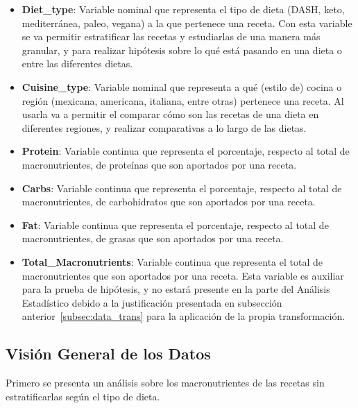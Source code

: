 \documentclass[12pt,a4paper]{article}
\begin{document}
        \begin{itemize}[label=\textbullet]

            \item \textbf{Diet\_type}: Variable nominal que representa el tipo de 
            dieta (DASH, keto, mediterránea, paleo, vegana) a la que 
            pertenece una receta. Con esta variable se va permitir estratificar 
            las recetas y estudiarlas de una manera más granular, y para realizar 
            hipótesis sobre lo qué está pasando en una dieta o entre las diferentes dietas.

            \item \textbf{Cuisine\_type}: Variable nominal que representa a qué (estilo 
            de) cocina o región (mexicana, americana, italiana, entre otras) pertenece una 
            receta. Al usarla va a permitir el comparar cómo son las recetas 
            de una dieta en diferentes regiones, y realizar comparativas a lo 
            largo de las dietas.

            \item \textbf{Protein}: Variable continua que representa el 
            porcentaje, respecto al total de macronutrientes, de proteínas que son 
            aportados por una receta.
            \item \textbf{Carbs}: Variable continua que representa el 
            porcentaje, respecto al total de macronutrientes, de carbohidratos que 
            son aportados por una receta.

            \item \textbf{Fat}: Variable continua que representa el 
            porcentaje, respecto al total de macronutrientes, de grasas que son 
            aportados por una receta.

            \item \textbf{Total\_Macronutrients}: Variable continua que representa 
            el total de macronutrientes que son aportados por una receta. Esta variable 
            es auxiliar para la prueba de hipótesis, y no estará presente en la parte 
            del Análisis Estadístico debido a la justificación presentada en 
            subsección anterior~\ref{subsec:data_trans} para la aplicación de la 
            propia transformación.

        \end{itemize}

    \subsection{Visión General de los Datos}
        Primero se presenta un análisis sobre los macronutrientes de 
        las recetas sin estratificarlas según el tipo de dieta.
\end{document}
